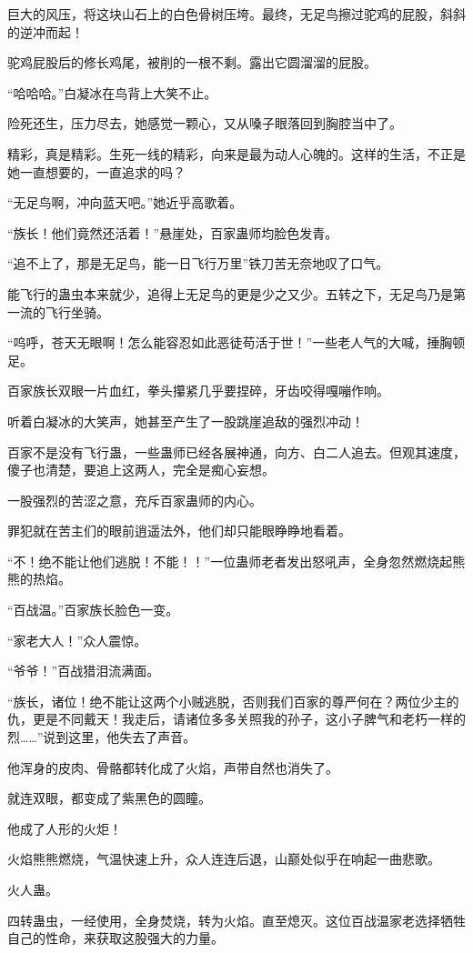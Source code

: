 \begin{this_body}
巨大的风压，将这块山石上的白色骨树压垮。最终，无足鸟擦过驼鸡的屁股，斜斜的逆冲而起！

驼鸡屁股后的修长鸡尾，被削的一根不剩。露出它圆溜溜的屁股。

“哈哈哈。”白凝冰在鸟背上大笑不止。

险死还生，压力尽去，她感觉一颗心，又从嗓子眼落回到胸腔当中了。

精彩，真是精彩。生死一线的精彩，向来是最为动人心魄的。这样的生活，不正是她一直想要的，一直追求的吗？

“无足鸟啊，冲向蓝天吧。”她近乎高歌着。

“族长！他们竟然还活着！”悬崖处，百家蛊师均脸色发青。

“追不上了，那是无足鸟，能一日飞行万里”铁刀苦无奈地叹了口气。

能飞行的蛊虫本来就少，追得上无足鸟的更是少之又少。五转之下，无足鸟乃是第一流的飞行坐骑。

“呜呼，苍天无眼啊！怎么能容忍如此恶徒苟活于世！”一些老人气的大喊，捶胸顿足。

百家族长双眼一片血红，拳头攥紧几乎要捏碎，牙齿咬得嘎嘣作响。

听着白凝冰的大笑声，她甚至产生了一股跳崖追敌的强烈冲动！

百家不是没有飞行蛊，一些蛊师已经各展神通，向方、白二人追去。但观其速度，傻子也清楚，要追上这两人，完全是痴心妄想。

一股强烈的苦涩之意，充斥百家蛊师的内心。

罪犯就在苦主们的眼前逍遥法外，他们却只能眼睁睁地看着。

“不！绝不能让他们逃脱！不能！！”一位蛊师老者发出怒吼声，全身忽然燃烧起熊熊的热焰。

“百战温。”百家族长脸色一变。

“家老大人！”众人震惊。

“爷爷！”百战猎泪流满面。

“族长，诸位！绝不能让这两个小贼逃脱，否则我们百家的尊严何在？两位少主的仇，更是不同戴天！我走后，请诸位多多关照我的孙子，这小子脾气和老朽一样的烈……”说到这里，他失去了声音。

他浑身的皮肉、骨骼都转化成了火焰，声带自然也消失了。

就连双眼，都变成了紫黑色的圆瞳。

他成了人形的火炬！

火焰熊熊燃烧，气温快速上升，众人连连后退，山巅处似乎在响起一曲悲歌。

火人蛊。

四转蛊虫，一经使用，全身焚烧，转为火焰。直至熄灭。这位百战温家老选择牺牲自己的性命，来获取这股强大的力量。


\end{this_body}
